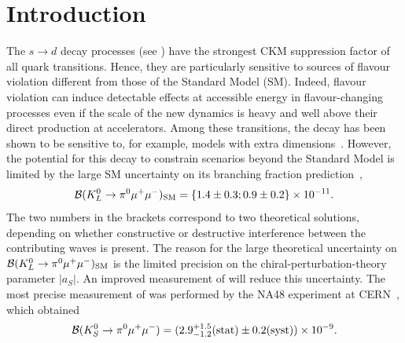 
\section{Introduction}
\label{sec:Introduction}

The $s\to d$ decay processes (see ) have the strongest CKM suppression factor of all quark transitions.
Hence, they are particularly sensitive to sources of flavour violation different from those of the
Standard Model (SM). Indeed, flavour violation can induce detectable effects at accessible energy in flavour-changing processes
even if the scale of the new dynamics is heavy and well above their direct production at accelerators.
Among these transitions, the decay \Klpizmm has been shown to be sensitive to, for example, models
with extra dimensions~\cite{Bauer:2009cf}. However, the potential for this decay to constrain scenarios
beyond the Standard Model is limited by the large SM uncertainty on its branching fraction prediction~\cite{Bauer:2009cf},%
\begin{equation}
{{\cal B}({\PKzL}\to\Pgpz\APmuon\Pmuon)_{\rm SM} = \{1.4\pm0.3; 0.9\pm0.2\}\times 10^{-11}.}
\end{equation}
The two numbers in the brackets correspond to two theoretical solutions, 
depending on whether constructive or destructive interference between the contributing waves is present.
The reason for the large theoretical uncertainty on ${\cal B}({K^{0}_{L}}\rightarrow\pi^{0}\mu^{+}\mu^{-})_{\rm SM}$ is the limited
precision on the chiral-perturbation-theory parameter $|a_S|$. An improved measurement of \BRof\Kspizmm will reduce this uncertainty.
The most precise measurement of \BRof\Kspizmm was performed by the NA48 experiment at CERN~\cite{NA48}, which obtained
\begin{equation}
{\cal B}({K^{0}_{S}}\rightarrow\pi^{0}\mu^{+}\mu^{-}) = (2.9^{+1.5}_{-1.2}\text{(stat)}\pm0.2\text{(syst)})\times10^{-9}.
\label{eq:NA48}
\end{equation}


